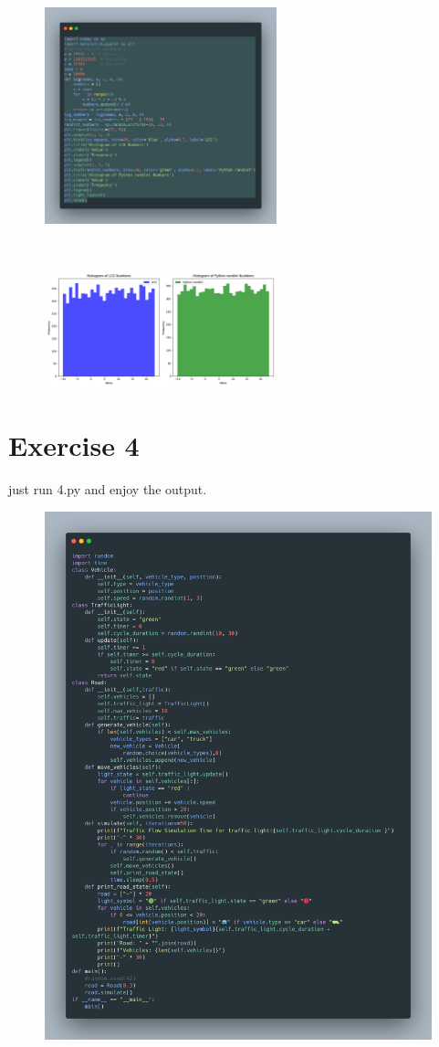 \documentclass[a4paper,12pt]{article}
\begin{document}
\begin{figure}[h!]
    \centering
    \includegraphics[width=0.6\textwidth]{./Screenshots/3.py.png} 
\end{figure} \\
\begin{figure}[h!]
    \centering
    \includegraphics[width=0.6\textwidth]{./Screenshots/3.png} 
\end{figure} 
\newpage

\section{Exercise 4}
just run 4.py and enjoy the output.
\begin{figure}[h!]
    \centering
    \includegraphics[width=1\textwidth]{./Screenshots/4.py.png} 
\end{figure}
\end{document}
